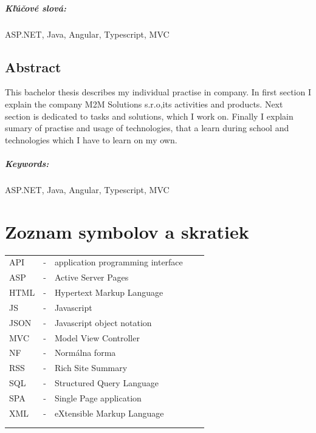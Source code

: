 \documentclass[11pt, oneside]{report}
\begin{document}
\paragraph*{Kľúčové slová:} ASP.NET, Java, Angular, Typescript, MVC

\paragraph*{}

\section*{Abstract}
This bachelor thesis describes my individual practise in company. In first section I explain the company  M2M Solutions s.r.o,its activities and products. Next section is dedicated to tasks and solutions, which I work on. Finally I explain sumary of practise and usage of technologies, that a learn during school and technologies which I have to learn on my own.


\paragraph*{Keywords:}  ASP.NET, Java, Angular, Typescript, MVC




\newpage 
\tableofcontents



\newpage

\chapter*{ Zoznam symbolov a skratiek }
\begin{table}[H]
\label{my-label}
\begin{tabular}{lllll}
API  & - &  application programming interface &  &  \\
ASP&- &Active Server Pages  &  &  \\
HTML & - &  Hypertext Markup Language&  &  \\
JS   & - & Javascript  &  &  \\
JSON & - & Javascript object notation &  &  \\
MVC  & - &  Model View Controller &  &  \\
NF & - &  Normálna forma &  &  \\
RSS & - &  Rich Site Summary &  &  \\
SQL  & - &  Structured Query Language&  &  \\
SPA  & - &  Single Page application&  &  \\
XML  & - &  eXtensible Markup Language &  &  \\
 &  &  &  &  \\
 &  &  &  & 
\end{tabular}
\end{table}
\newpage 
\end{document}
